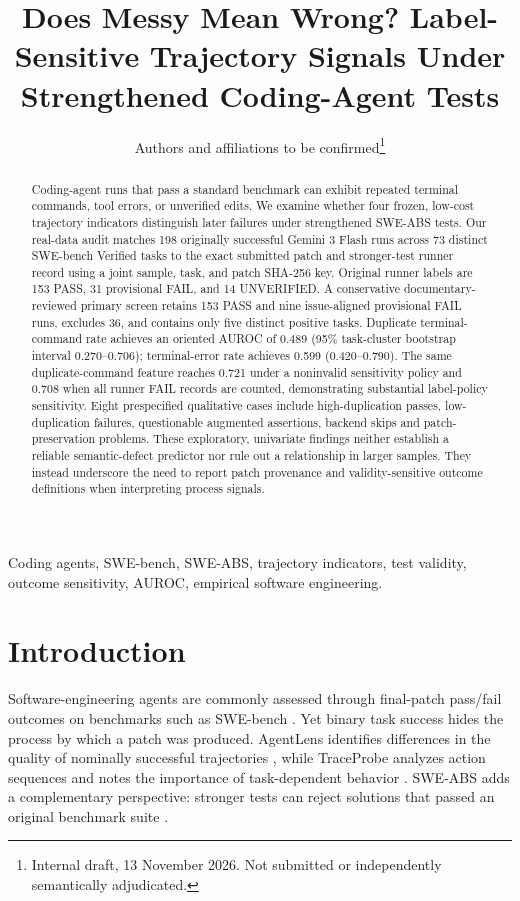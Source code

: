 \documentclass[journal]{IEEEtran}
\begin{document}
\title{Does Messy Mean Wrong? Label-Sensitive Trajectory Signals Under Strengthened Coding-Agent Tests}
\author{Authors and affiliations to be confirmed\thanks{Internal draft, 13 November 2026. Not submitted or independently semantically adjudicated.}}
\maketitle
\begin{abstract}
Coding-agent runs that pass a standard benchmark can exhibit repeated terminal commands, tool errors, or unverified edits. We examine whether four frozen, low-cost trajectory indicators distinguish later failures under strengthened SWE-ABS tests. Our real-data audit matches 198 originally successful Gemini 3 Flash runs across 73 distinct SWE-bench Verified tasks to the exact submitted patch and stronger-test runner record using a joint sample, task, and patch SHA-256 key. Original runner labels are 153 PASS, 31 provisional FAIL, and 14 UNVERIFIED. A conservative documentary-reviewed primary screen retains 153 PASS and nine issue-aligned provisional FAIL runs, excludes 36, and contains only five distinct positive tasks. Duplicate terminal-command rate achieves an oriented AUROC of 0.489 (95\% task-cluster bootstrap interval 0.270--0.706); terminal-error rate achieves 0.599 (0.420--0.790). The same duplicate-command feature reaches 0.721 under a noninvalid sensitivity policy and 0.708 when all runner FAIL records are counted, demonstrating substantial label-policy sensitivity. Eight prespecified qualitative cases include high-duplication passes, low-duplication failures, questionable augmented assertions, backend skips and patch-preservation problems. These exploratory, univariate findings neither establish a reliable semantic-defect predictor nor rule out a relationship in larger samples. They instead underscore the need to report patch provenance and validity-sensitive outcome definitions when interpreting process signals.
\end{abstract}
\begin{IEEEkeywords}
Coding agents, SWE-bench, SWE-ABS, trajectory indicators, test validity, outcome sensitivity, AUROC, empirical software engineering.
\end{IEEEkeywords}

\section{Introduction}
Software-engineering agents are commonly assessed through final-patch pass/fail outcomes on benchmarks such as SWE-bench \cite{jimenez2024swebench}. Yet binary task success hides the process by which a patch was produced. AgentLens identifies differences in the quality of nominally successful trajectories \cite{sahoo2026agentlens}, while TraceProbe analyzes action sequences and notes the importance of task-dependent behavior \cite{shu2026traceprobe}. SWE-ABS adds a complementary perspective: stronger tests can reject solutions that passed an original benchmark suite \cite{yu2026sweabs}.
\end{document}
